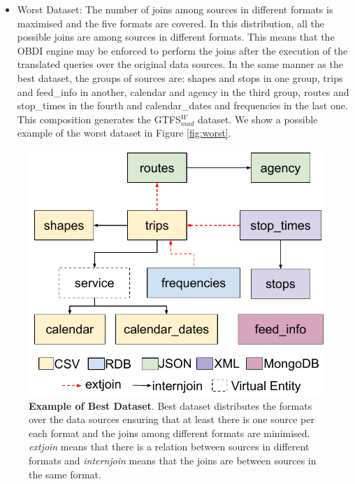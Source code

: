 \begin{enumerate}[label=\textbf{\arabic*})]
\begin{itemize}
        \item Worst Dataset: The number of joins among sour\-ces in different formats is maximised and the five formats are covered. In this distribution, all the possible joins are among
        sources in different formats. This means that the OBDI engine may be enforced to perform the joins after the execution of the translated queries over the original data sources. In the same manner as the best dataset, the groups of sources are: shapes and stops in one group, trips and feed\_info in another, calendar and agency in the third group, routes and stop\_times in the fourth and calendar\_dates and frequencies in the last one. This composition generates the GTFS$_{mad}^{W}$ dataset. We show a possible example of the worst dataset in Figure \ref{fig:worst}. 
    \end{itemize}
   
\end{enumerate}
 

\begin{figure}[h]
    \centering
    \includegraphics[width=0.85\linewidth]{figures/best-dist.pdf}
    \caption[Example of best dataset]{\textbf{Example of Best Dataset}. Best dataset distributes the formats over the data sources ensuring that at least there is one source per each format and the joins among different formats are minimised. \textit{extjoin} means that there is a relation between sources in different formats and \textit{internjoin} means that the joins are between sources in the same format.}
    \label{fig:best}
\end{figure}


